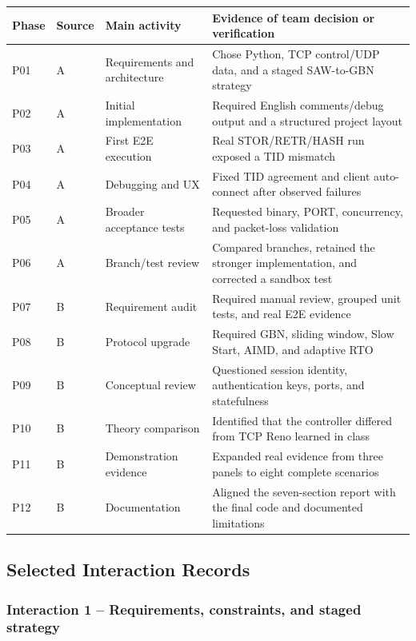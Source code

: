 \begin{longtable}{p{}p{}p{}p{}}
\toprule
Phase & Source & Main activity & Evidence of team decision or verification\\
\midrule
P01 & A & Requirements and architecture & Chose Python, TCP control/UDP data, and a staged SAW-to-GBN strategy\\
P02 & A & Initial implementation & Required English comments/debug output and a structured project layout\\
P03 & A & First E2E execution & Real STOR/RETR/HASH run exposed a TID mismatch\\
P04 & A & Debugging and UX & Fixed TID agreement and client auto-connect after observed failures\\
P05 & A & Broader acceptance tests & Requested binary, PORT, concurrency, and packet-loss validation\\
P06 & A & Branch/test review & Compared branches, retained the stronger implementation, and corrected a sandbox test\\
P07 & B & Requirement audit & Required manual review, grouped unit tests, and real E2E evidence\\
P08 & B & Protocol upgrade & Required GBN, sliding window, Slow Start, AIMD, and adaptive RTO\\
P09 & B & Conceptual review & Questioned session identity, authentication keys, ports, and statefulness\\
P10 & B & Theory comparison & Identified that the controller differed from TCP Reno learned in class\\
P11 & B & Demonstration evidence & Expanded real evidence from three panels to eight complete scenarios\\
P12 & B & Documentation & Aligned the seven-section report with the final code and documented limitations\\
\bottomrule
\end{longtable}

\subsection{Selected Interaction Records}

\subsubsection{Interaction 1 -- Requirements, constraints, and staged strategy}

